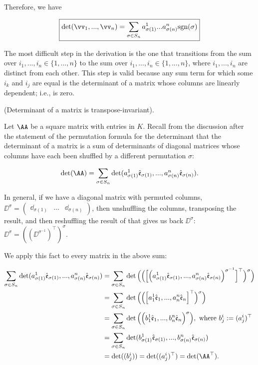 \begin{deriv}
    Therefore, we have
    
    \begin{align*}
        \boxed
        {
            \det(\vv_1, ..., \vv_n) = \sum_{\sigma \in S_n} a^1_{\sigma(1)} ... a^n_{\sigma(n)} \sgn(\sigma)
        }
    \end{align*}
    
    The most difficult step in the derivation is the one that transitions from the sum over $i_1, ..., i_n \in \{1, ..., n\}$ to the sum over $i_1, ..., i_n \in \{1, ..., n\}$, where $i_1, ..., i_n$ are distinct from each other. This step is valid because any sum term for which some $i_k$ and $i_j$ are equal is the determinant of a matrix whose columns are linearly dependent; i.e., is zero.
\end{deriv}

\begin{deriv}
\label{ch::lin_alg::thm::det_transpose_invariant}    
    (Determinant of a matrix is transpose-invariant).
    
    Let $\AA$ be a square matrix with entries in $K$. Recall from the discussion after the statement of the permutation formula for the determinant that the determinant of a matrix is a sum of determinants of diagonal matrices whose columns have each been shuffled by a different permutation $\sigma$:
    
    \begin{align*}
        \det(\AA) = 
        \sum_{\sigma \in S_n}
        \det(a^1_{\sigma(1)} \see_{\sigma(1)}, ..., a^n_{\sigma(n)} \see_{\sigma(n)}).
    \end{align*}

    In general, if we have a diagonal matrix with permuted columns, $\DD^\sigma = \begin{pmatrix} \dd_{\sigma(1)} & \hdots & \dd_{\sigma(n)} \end{pmatrix}$, then unshuffling the columns, transposing the result, and then reshuffling the result of that gives us back $\DD^\sigma$: $\DD^\sigma = ((\DD^{\sigma^{-1}})^\top)^\sigma$.

    We apply this fact to every matrix in the above sum:

    \begin{align*}
        \sum_{\sigma \in S_n}
        \det(a^1_{\sigma(1)} \see_{\sigma(1)}, ..., a^n_{\sigma(n)} \see_{\sigma(n)})
        &=
        \sum_{\sigma \in S_n}
        \det\Big( \Big(\Big[\Big(a^1_{\sigma(1)} \see_{\sigma(1)}, ..., a^n_{\sigma(n)} \see_{\sigma(n)}\Big)^{\sigma^{-1}}\Big]^\top\Big)^\sigma \Big) \\
        &= \sum_{\sigma \in S_n} \det\Big(\Big(\Big[ a^1_1 \see_1, ..., a^n_n \see_n \Big]^\top \Big)^\sigma\Big) \\
        &= \sum_{\sigma \in S_n} \det\Big(\Big( b^1_1 \see_1, ..., b^n_n \see_n\Big)^\sigma\Big), \text{ where $b^i_j := (a^i_j)^\top$} \\
        &= \sum_{\sigma \in S_n}
        \det(b^1_{\sigma(1)} \see_{\sigma(1)}, ..., b^n_{\sigma(n)} \see_{\sigma(n)}) \\
        &= \det((b^i_j)) = \det((a^i_j)^\top) = \det(\AA^\top).
    \end{align*}
    

\end{deriv}
